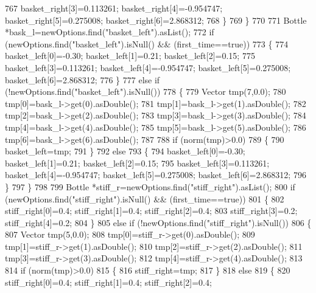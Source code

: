 \begin{DoxyCode}
767             basket_right[3]=0.113261; basket_right[4]=-0.954747; basket_right[5]=0.275008; 
      basket_right[6]=2.868312;
768         \}
769     \}
770 
771     Bottle *bask\_l=newOptions.find(\textcolor{stringliteral}{"basket\_left"}).asList();
772     \textcolor{keywordflow}{if} (newOptions.find(\textcolor{stringliteral}{"basket\_left"}).isNull() && (first\_time==\textcolor{keyword}{true}))
773     \{
774         basket_left[0]=-0.30; basket_left[1]=0.21; basket_left[2]=0.15;
775         basket_left[3]=0.113261; basket_left[4]=-0.954747; basket_left[5]=0.275008; 
      basket_left[6]=2.868312;
776     \}
777     \textcolor{keywordflow}{else} \textcolor{keywordflow}{if} (!newOptions.find(\textcolor{stringliteral}{"basket\_left"}).isNull())
778     \{
779         Vector tmp(7,0.0);
780         tmp[0]=bask\_l->get(0).asDouble();
781         tmp[1]=bask\_l->get(1).asDouble();
782         tmp[2]=bask\_l->get(2).asDouble();
783         tmp[3]=bask\_l->get(3).asDouble();
784         tmp[4]=bask\_l->get(4).asDouble();
785         tmp[5]=bask\_l->get(5).asDouble();
786         tmp[6]=bask\_l->get(6).asDouble();
787 
788         \textcolor{keywordflow}{if} (norm(tmp)>0.0)
789         \{
790             basket_left=tmp;
791         \}
792         \textcolor{keywordflow}{else}
793         \{
794             basket_left[0]=-0.30; basket_left[1]=0.21; basket_left[2]=0.15;
795             basket_left[3]=0.113261; basket_left[4]=-0.954747; basket_left[5]=0.275008; 
      basket_left[6]=2.868312;
796         \}
797     \}
798 
799     Bottle *stiff\_r=newOptions.find(\textcolor{stringliteral}{"stiff\_right"}).asList();
800     \textcolor{keywordflow}{if} (newOptions.find(\textcolor{stringliteral}{"stiff\_right"}).isNull() && (first\_time==\textcolor{keyword}{true}))
801     \{
802         stiff_right[0]=0.4; stiff_right[1]=0.4; stiff_right[2]=0.4;
803         stiff_right[3]=0.2; stiff_right[4]=0.2;
804     \}
805     \textcolor{keywordflow}{else} \textcolor{keywordflow}{if} (!newOptions.find(\textcolor{stringliteral}{"stiff\_right"}).isNull())
806     \{
807         Vector tmp(5,0.0);
808         tmp[0]=stiff\_r->get(0).asDouble();
809         tmp[1]=stiff\_r->get(1).asDouble();
810         tmp[2]=stiff\_r->get(2).asDouble();
811         tmp[3]=stiff\_r->get(3).asDouble();
812         tmp[4]=stiff\_r->get(4).asDouble();
813 
814         \textcolor{keywordflow}{if} (norm(tmp)>0.0)
815         \{
816             stiff_right=tmp;
817         \}
818         \textcolor{keywordflow}{else}
819         \{
820             stiff_right[0]=0.4; stiff_right[1]=0.4; stiff_right[2]=0.4;

\end{DoxyCode}
